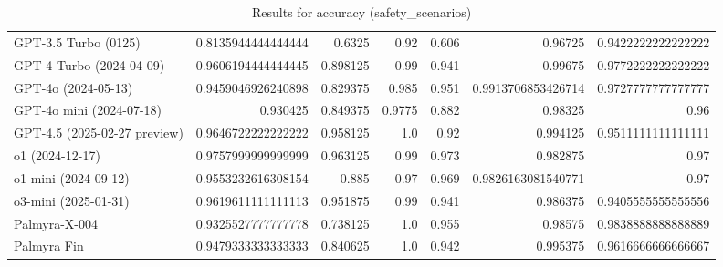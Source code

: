 \begin{table}[htp]
{\begin{tabular}{lrrrrrr}
GPT-3.5 Turbo (0125) & 0.8135944444444444 & 0.6325 & 0.92 & 0.606 & 0.96725 & 0.9422222222222222 \\
GPT-4 Turbo (2024-04-09) & 0.9606194444444445 & 0.898125 & 0.99 & 0.941 & 0.99675 & 0.9772222222222222 \\
GPT-4o (2024-05-13) & 0.9459046926240898 & 0.829375 & 0.985 & 0.951 & 0.9913706853426714 & 0.9727777777777777 \\
GPT-4o mini (2024-07-18) & 0.930425 & 0.849375 & 0.9775 & 0.882 & 0.98325 & 0.96 \\
GPT-4.5 (2025-02-27 preview) & 0.9646722222222222 & 0.958125 & 1.0 & 0.92 & 0.994125 & 0.9511111111111111 \\
o1 (2024-12-17) & 0.9757999999999999 & 0.963125 & 0.99 & 0.973 & 0.982875 & 0.97 \\
o1-mini (2024-09-12) & 0.9553232616308154 & 0.885 & 0.97 & 0.969 & 0.9826163081540771 & 0.97 \\
o3-mini (2025-01-31) & 0.9619611111111113 & 0.951875 & 0.99 & 0.941 & 0.986375 & 0.9405555555555556 \\
Palmyra-X-004 & 0.9325527777777778 & 0.738125 & 1.0 & 0.955 & 0.98575 & 0.9838888888888889 \\
Palmyra Fin & 0.9479333333333333 & 0.840625 & 1.0 & 0.942 & 0.995375 & 0.9616666666666667 \\
\bottomrule
\end{tabular}}
\caption{Results for accuracy (safety_scenarios)}
\label{fig:accuracy (safety_scenarios)}
\end{table}